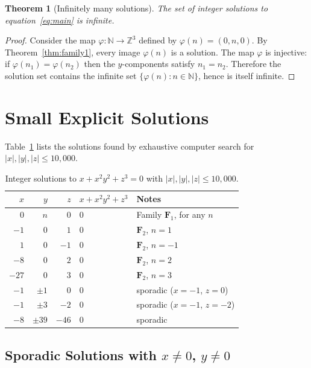 \documentclass[12pt,a4paper]{article}
\newtheorem{theorem}{Theorem}[section]
\theoremstyle{definition}
\newcommand{\Z}{\mathbb{Z}}
\newcommand{\N}{\mathbb{N}}
\begin{document}
\begin{theorem}[Infinitely many solutions]\label{thm:infinite}
  The set of integer solutions to equation~\eqref{eq:main} is infinite.
\end{theorem}

\begin{proof}
  Consider the map $\varphi \colon \N \to \Z^3$ defined by $\varphi(n) = (0, n, 0)$.
  By Theorem~\ref{thm:family1}, every image $\varphi(n)$ is a solution.
  The map $\varphi$ is injective: if $\varphi(n_1) = \varphi(n_2)$ then the $y$-components
  satisfy $n_1 = n_2$.  Therefore the solution set contains the infinite set
  $\{\varphi(n) : n \in \N\}$, hence is itself infinite.
\end{proof}

\section{Small Explicit Solutions}

Table~\ref{tab:solutions} lists the solutions found by exhaustive computer search for
$|x|, |y|, |z| \leq 10{,}000$.

\begin{table}[h]
\centering
\caption{Integer solutions to $x + x^2 y^2 + z^3 = 0$ with $|x|,|y|,|z| \leq 10{,}000$.}
\label{tab:solutions}
\begin{tabular}{rrrll}
\toprule
$x$ & $y$ & $z$ & $x + x^2y^2 + z^3$ & Notes \\
\midrule
$0$ & $n$ & $0$ & $0$ & Family $\mathbf{F}_1$, for any $n$ \\
$-1$ & $0$ & $1$ & $0$ & $\mathbf{F}_2$, $n=1$ \\
$1$ & $0$ & $-1$ & $0$ & $\mathbf{F}_2$, $n=-1$ \\
$-8$ & $0$ & $2$ & $0$ & $\mathbf{F}_2$, $n=2$ \\
$-27$ & $0$ & $3$ & $0$ & $\mathbf{F}_2$, $n=3$ \\
$-1$ & $\pm 1$ & $0$ & $0$ & sporadic ($x=-1$, $z=0$) \\
$-1$ & $\pm 3$ & $-2$ & $0$ & sporadic ($x=-1$, $z=-2$) \\
$-8$ & $\pm 39$ & $-46$ & $0$ & sporadic \\
\bottomrule
\end{tabular}
\end{table}

\subsection{Sporadic Solutions with \texorpdfstring{$x \neq 0$, $y \neq 0$}{x,y nonzero}}
\end{document}
